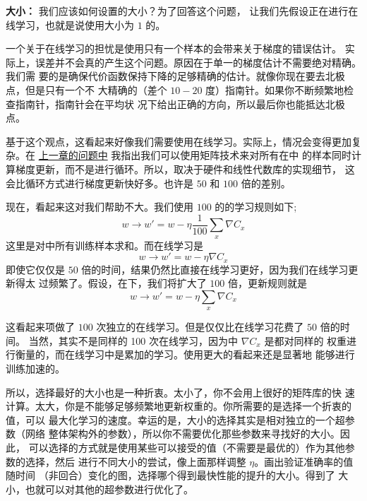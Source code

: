 \label{mini_batch_size}
\textbf{\minibatch{}大小：} 我们应该如何设置\minibatch{}的大小？为了回答这个问题，
让我们先假设正在进行在线学习，也就是说使用大小为 $1$ 的\minibatch{}。

一个关于在线学习的担忧是使用只有一个样本的\minibatch{}会带来关于梯度的错误估计。
实际上，误差并不会真的产生这个问题。原因在于单一的梯度估计不需要绝对精确。我们需
要的是确保代价函数保持下降的足够精确的估计。就像你现在要去北极点，但是只有一个不
大精确的（差个 $10-20$ 度）指南针。如果你不断频繁地检查指南针，指南针会在平均状
况下给出正确的方向，所以最后你也能抵达北极点。

基于这个观点，这看起来好像我们需要使用在线学习。实际上，情况会变得更加复杂。在
\hyperref[ch:]{上一章的问题中} 我指出我们可以使用矩阵技术来对所有在\minibatch{}中
的样本同时计算梯度更新，而不是进行循环。所以，取决于硬件和线性代数库的实现细节，
这会比循环方式进行梯度更新快好多。也许是 $50$ 和 $100$ 倍的差别。

现在，看起来这对我们帮助不大。我们使用 $100$ 的\minibatch{}的学习规则如下;
\begin{equation}
  w \rightarrow w' = w-\eta \frac{1}{100} \sum_x \nabla C_x
  \label{eq:100}\tag{100}
\end{equation}
这里是对\minibatch{}中所有训练样本求和。而在线学习是
\begin{equation}
  w \rightarrow w' = w-\eta \nabla C_x
  \label{eq:101}\tag{101}
\end{equation}
即使它仅仅是 $50$ 倍的时间，结果仍然比直接在线学习更好，因为我们在线学习更新得太
过频繁了。假设，在\minibatch{}下，我们将\learningrate{}扩大了 $100$ 倍，更新规则就是
\begin{equation}
  w \rightarrow w' = w-\eta \sum_x \nabla C_x
  \label{eq:102}\tag{102}
\end{equation}

这看起来项做了 $100$ 次独立的在线学习。但是仅仅比在线学习花费了 $50$ 倍的时间。
当然，其实不是同样的 100 次在线学习，因为\minibatch{}中 $\nabla C_x$ 是都对同样的
权重进行衡量的，而在线学习中是累加的学习。使用更大的\minibatch{}看起来还是显著地
能够进行训练加速的。

所以，选择最好的\minibatch{}大小也是一种折衷。太小了，你不会用上很好的矩阵库的快
速计算。太大，你是不能够足够频繁地更新权重的。你所需要的是选择一个折衷的值，可以
最大化学习的速度。幸运的是，\minibatch{}大小的选择其实是相对独立的一个超参数（网络
  整体架构外的参数），所以你不需要优化那些参数来寻找好的\minibatch{}大小。因此，
可以选择的方式就是使用某些可以接受的值（不需要是最优的）作为其他参数的选择，然后
进行不同\minibatch{}大小的尝试，像上面那样调整 $\eta$。画出验证准确率的值随时间
（非回合）变化的图，选择哪个得到最快性能的提升的\minibatch{}大小。得到了
\minibatch{}大小，也就可以对其他的超参数进行优化了。

